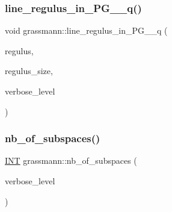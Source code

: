 \mbox{\label{classgrassmann_aa18017241af3cd660d4763ff8399d1c8}} 
\subsubsection{\texorpdfstring{line\+\_\+regulus\+\_\+in\+\_\+\+P\+G\+\_\+\_\+q()}{line\_regulus\_in\_PG\_3\_q()}}
{\footnotesize\ttfamily void grassmann\+::line\+\_\+regulus\+\_\+in\+\_\+\+P\+G\+\_\+\_\+q (\begin{DoxyParamCaption}\item[{\mbox{\hyperlink{galois_8h_a09fddde158a3a20bd2dcadb609de11dc}{I\+NT}} $\ast$\&}]{regulus,  }\item[{\mbox{\hyperlink{galois_8h_a09fddde158a3a20bd2dcadb609de11dc}{I\+NT}} \&}]{regulus\+\_\+size,  }\item[{\mbox{\hyperlink{galois_8h_a09fddde158a3a20bd2dcadb609de11dc}{I\+NT}}}]{verbose\+\_\+level }\end{DoxyParamCaption})}

\mbox{\label{classgrassmann_aba8f53731d3cdd10147559e2a7eee452}} 
\subsubsection{\texorpdfstring{nb\+\_\+of\+\_\+subspaces()}{nb\_of\_subspaces()}}
{\footnotesize\ttfamily \mbox{\hyperlink{galois_8h_a09fddde158a3a20bd2dcadb609de11dc}{I\+NT}} grassmann\+::nb\+\_\+of\+\_\+subspaces (\begin{DoxyParamCaption}\item[{\mbox{\hyperlink{galois_8h_a09fddde158a3a20bd2dcadb609de11dc}{I\+NT}}}]{verbose\+\_\+level }\end{DoxyParamCaption})}

\mbox{\label{classgrassmann_a83e2f002ecb069b39ef098ca4acc1f9b}} 
